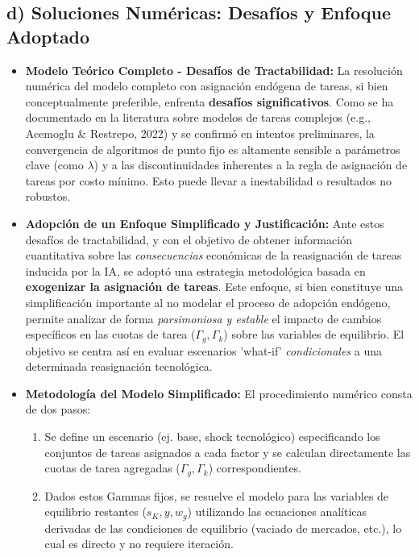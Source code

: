 \documentclass{article}
\theoremstyle{remark}
\theoremstyle{definition}
\begin{document}
\begin{enumerate}
\begin{tcolorbox}[title= Solución Punto 4 (Revisado y Justificado)]
\subsection*{d) Soluciones Numéricas: Desafíos y Enfoque Adoptado}

\begin{itemize}
    \item \textbf{Modelo Teórico Completo - Desafíos de Tractabilidad:} La resolución numérica del modelo completo con asignación endógena de tareas, si bien conceptualmente preferible, enfrenta \textbf{desafíos significativos}. Como se ha documentado en la literatura sobre modelos de tareas complejos (e.g., Acemoglu \& Restrepo, 2022) y se confirmó en intentos preliminares, la convergencia de algoritmos de punto fijo es altamente sensible a parámetros clave (como $\lambda$) y a las discontinuidades inherentes a la regla de asignación de tareas por costo mínimo. Esto puede llevar a inestabilidad o resultados no robustos.

    \item \textbf{Adopción de un Enfoque Simplificado y Justificación:} Ante estos desafíos de tractabilidad, y con el objetivo de obtener información cuantitativa sobre las \textit{consecuencias} económicas de la reasignación de tareas inducida por la IA, se adoptó una estrategia metodológica basada en \textbf{exogenizar la asignación de tareas}. Este enfoque, si bien constituye una simplificación importante al no modelar el proceso de adopción endógeno, permite analizar de forma \textit{parsimoniosa y estable} el impacto de cambios específicos en las cuotas de tarea ($\Gamma_g, \Gamma_k$) sobre las variables de equilibrio. El objetivo se centra así en evaluar escenarios 'what-if' \textit{condicionales} a una determinada reasignación tecnológica.

    \item \textbf{Metodología del Modelo Simplificado:} El procedimiento numérico consta de dos pasos:
    \begin{enumerate}
        \item Se define un escenario (ej. base, shock tecnológico) especificando los conjuntos de tareas asignados a cada factor y se calculan directamente las cuotas de tarea agregadas ($\Gamma_g, \Gamma_k$) correspondientes.
        \item Dados estos Gammas fijos, se resuelve el modelo para las variables de equilibrio restantes ($s_K, y, w_g$) utilizando las ecuaciones analíticas derivadas de las condiciones de equilibrio (vaciado de mercados, etc.), lo cual es directo y no requiere iteración.
    \end{enumerate}


\end{itemize}
\end{tcolorbox}
\end{enumerate}
\end{document}
